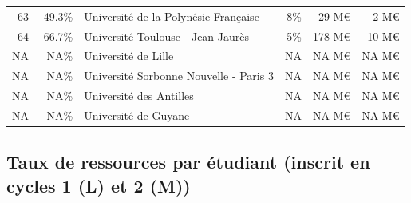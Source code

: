\documentclass[12pt,french,]{article}
\begin{document}
\begin{longtable}{rrlrrr}
\rowcolor{gray!6}  63 & -49.3\% & Université de la Polynésie Française & 8\% & 29 M€ & 2 M€\\
64 & -66.7\% & Université Toulouse - Jean Jaurès & 5\% & 178 M€ & 10 M€\\
\rowcolor{gray!6}  NA & NA\% & Université de Lille & NA & NA M€ & NA M€\\
\addlinespace
NA & NA\% & Université Sorbonne Nouvelle - Paris 3 & NA & NA M€ & NA M€\\
\rowcolor{gray!6}  NA & NA\% & Université des Antilles & NA & NA M€ & NA M€\\
NA & NA\% & Université de Guyane & NA & NA M€ & NA M€\\*
\end{longtable}

\newpage

\hypertarget{taux-de-ressources-par-uxe9tudiant-inscrit-en-cycles-1-l-et-2-m}{%
\subsection{Taux de ressources par étudiant (inscrit en cycles 1 (L) et
2
(M))}\label{taux-de-ressources-par-uxe9tudiant-inscrit-en-cycles-1-l-et-2-m}}
\end{document}
